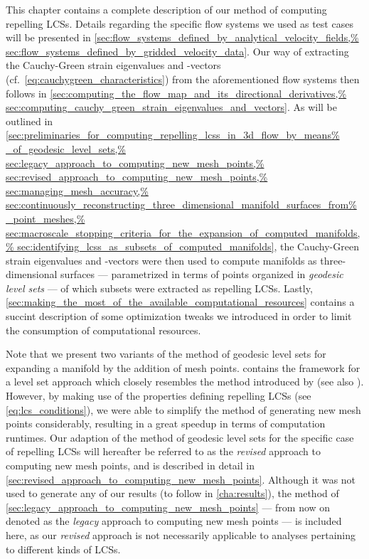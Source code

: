 This chapter contains a complete description of our method of computing
repelling LCSs. Details regarding the specific flow systems we used as test
cases will be presented in
\cref{sec:flow_systems_defined_by_analytical_velocity_fields,%
sec:flow_systems_defined_by_gridded_velocity_data}. Our way of extracting
the Cauchy-Green strain eigenvalues and -vectors (cf.\
\cref{eq:cauchygreen_characteristics}) from the aforementioned flow systems
then follows in
\cref{sec:computing_the_flow_map_and_its_directional_derivatives,%
sec:computing_cauchy_green_strain_eigenvalues_and_vectors}. As will be outlined
in \cref{sec:preliminaries_for_computing_repelling_lcss_in_3d_flow_by_means%
_of_geodesic_level_sets,%
sec:legacy_approach_to_computing_new_mesh_points,%
sec:revised_approach_to_computing_new_mesh_points,%
sec:managing_mesh_accuracy,%
sec:continuously_reconstructing_three_dimensional_manifold_surfaces_from%
_point_meshes,%
sec:macroscale_stopping_criteria_for_the_expansion_of_computed_manifolds,%
sec:identifying_lcss_as_subsets_of_computed_manifolds}, the Cauchy-Green
strain eigenvalues and -vectors were then used to compute manifolds as
three-dimensional surfaces --- parametrized in terms of points organized in
\emph{geodesic level sets} --- of which subsets were extracted as repelling
LCSs. Lastly,
\cref{sec:making_the_most_of_the_available_computational_resources} contains a
succint description of some optimization tweaks we introduced in order to limit
the consumption of computational resources.

Note that we present two variants of the method of geodesic level sets for
expanding a manifold by the addition of mesh points.
 contains the framework
for a level set approach which closely resembles the method introduced by
\textcite{krauskopf2005survey} (see also \textcite{krauskopf2003computing}).
However, by making use of the properties defining repelling LCSs (see
\cref{eq:lcs_conditions}), we were able to simplify the method of generating
new mesh points considerably, resulting in a great speedup in terms of
computation runtimes. Our adaption of the method of geodesic level sets for the
specific case of repelling LCSs will hereafter be referred to as the
\emph{revised} approach to computing new mesh points, and is described in
detail in \cref{sec:revised_approach_to_computing_new_mesh_points}. Although it
was not used to generate any of our results (to follow in \cref{cha:results}),
the method of \cref{sec:legacy_approach_to_computing_new_mesh_points} --- from
now on denoted as the \emph{legacy} approach to computing new mesh points ---
is included here, as our \emph{revised} approach is not necessarily applicable
to analyses pertaining to different kinds of LCSs.


